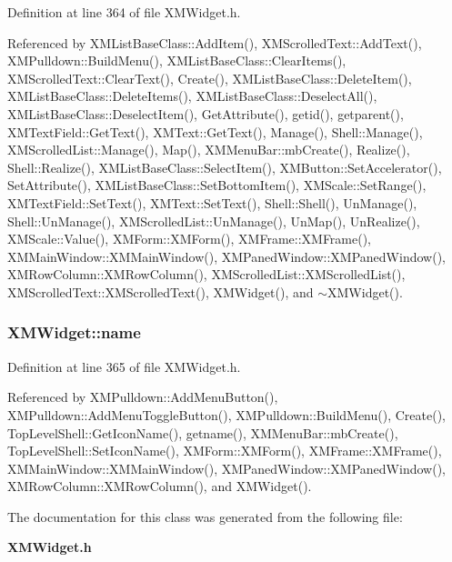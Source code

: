 Definition at line 364 of file XMWidget.h.

Referenced by XMList\-Base\-Class::Add\-Item(), XMScrolled\-Text::Add\-Text(), XMPulldown::Build\-Menu(), XMList\-Base\-Class::Clear\-Items(), XMScrolled\-Text::Clear\-Text(), Create(), XMList\-Base\-Class::Delete\-Item(), XMList\-Base\-Class::Delete\-Items(), XMList\-Base\-Class::Deselect\-All(), XMList\-Base\-Class::Deselect\-Item(), Get\-Attribute(), getid(), getparent(), XMText\-Field::Get\-Text(), XMText::Get\-Text(), Manage(), Shell::Manage(), XMScrolled\-List::Manage(), Map(), XMMenu\-Bar::mb\-Create(), Realize(), Shell::Realize(), XMList\-Base\-Class::Select\-Item(), XMButton::Set\-Accelerator(), Set\-Attribute(), XMList\-Base\-Class::Set\-Bottom\-Item(), XMScale::Set\-Range(), XMText\-Field::Set\-Text(), XMText::Set\-Text(), Shell::Shell(), Un\-Manage(), Shell::Un\-Manage(), XMScrolled\-List::Un\-Manage(), Un\-Map(), Un\-Realize(), XMScale::Value(), XMForm::XMForm(), XMFrame::XMFrame(), XMMain\-Window::XMMain\-Window(), XMPaned\-Window::XMPaned\-Window(), XMRow\-Column::XMRow\-Column(), XMScrolled\-List::XMScrolled\-List(), XMScrolled\-Text::XMScrolled\-Text(), XMWidget(), and $\sim$XMWidget().
\subsubsection{ XMWidget::name\hspace{0.3cm}{\tt  [protected]}}\label{classXMWidget_n1}




Definition at line 365 of file XMWidget.h.

Referenced by XMPulldown::Add\-Menu\-Button(), XMPulldown::Add\-Menu\-Toggle\-Button(), XMPulldown::Build\-Menu(), Create(), Top\-Level\-Shell::Get\-Icon\-Name(), getname(), XMMenu\-Bar::mb\-Create(), Top\-Level\-Shell::Set\-Icon\-Name(), XMForm::XMForm(), XMFrame::XMFrame(), XMMain\-Window::XMMain\-Window(), XMPaned\-Window::XMPaned\-Window(), XMRow\-Column::XMRow\-Column(), and XMWidget().

The documentation for this class was generated from the following file:\begin{CompactItemize}
\item 
{\bf XMWidget.h}\end{CompactItemize}
